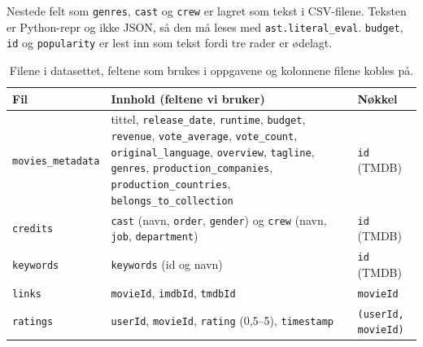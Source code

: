 \documentclass[11pt,a4paper]{article}
\begin{document}
Nestede felt som \texttt{genres}, \texttt{cast} og \texttt{crew} er lagret som tekst i CSV-filene. Teksten er Python-repr og ikke JSON, så den må leses med \texttt{ast.literal\_eval}. \texttt{budget}, \texttt{id} og \texttt{popularity} er lest inn som tekst fordi tre rader er ødelagt.

\begin{table}[H]
\centering
\small
\begin{tabular}{|>{\raggedright\arraybackslash}p{3.3cm}|>{\raggedright\arraybackslash}p{7.7cm}|>{\raggedright\arraybackslash}p{3.2cm}|}
\hline
\textbf{Fil} & \textbf{Innhold (feltene vi bruker)} & \textbf{Nøkkel} \\ \hline
\texttt{movies\_metadata} & tittel, \texttt{release\_date}, \texttt{runtime}, \texttt{budget}, \texttt{revenue}, \texttt{vote\_average}, \texttt{vote\_count}, \texttt{original\_language}, \texttt{overview}, \texttt{tagline}, \texttt{genres}, \texttt{production\_companies}, \texttt{production\_countries}, \texttt{belongs\_to\_collection} & \texttt{id} (TMDB) \\ \hline
\texttt{credits} & \texttt{cast} (navn, \texttt{order}, \texttt{gender}) og \texttt{crew} (navn, \texttt{job}, \texttt{department}) & \texttt{id} (TMDB) \\ \hline
\texttt{keywords} & \texttt{keywords} (id og navn) & \texttt{id} (TMDB) \\ \hline
\texttt{links} & \texttt{movieId}, \texttt{imdbId}, \texttt{tmdbId} & \texttt{movieId} \\ \hline
\texttt{ratings} & \texttt{userId}, \texttt{movieId}, \texttt{rating} (0,5--5), \texttt{timestamp} & \texttt{(userId, movieId)} \\ \hline
\end{tabular}
\caption{Filene i datasettet, feltene som brukes i oppgavene og kolonnene filene kobles på.}\label{tab:filer}
\end{table}
\end{document}
